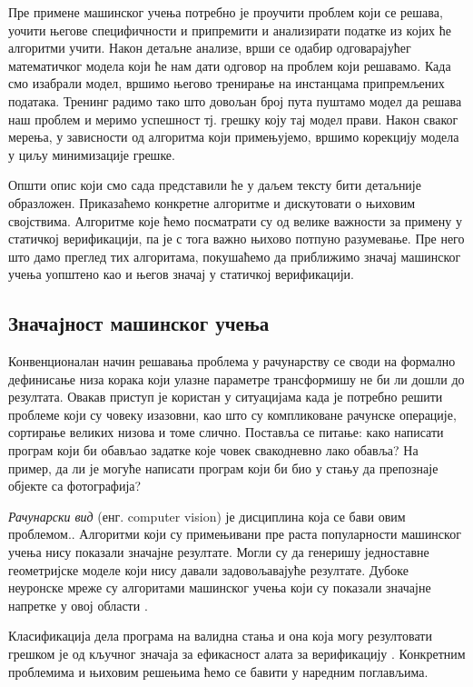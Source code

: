\documentclass[a4paper]{article}
\begin{document}
{Пре примене машинског учења потребно је проучити проблем који се решава, уочити његове специфичности и припремити и анализирати податке из којих ће алгоритми учити. Након детаљне анализе, врши се одабир одговарајућег математичког модела који ће нам дати одговор на проблем који решавамо. Када смо изабрали модел, вршимо његово тренирање на инстанцама припремљених података. Тренинг радимо тако што довољан број пута пуштамо модел да решава наш проблем и меримо успешност тј. грешку коју тај модел прави. Након сваког мерења, у зависности од алгоритма који примењујемо, вршимо корекцију модела у циљу минимизације грешке.


Општи опис који смо сада представили ће у даљем тексту бити детаљније образложен. Приказаћемо конкретне алгоритме и дискутовати о њиховим својствима. Алгоритме које ћемо посматрати су од велике важности за примену у статичкој верификацији, па је с тога важно њихово потпуно разумевање. Пре него што дамо преглед тих алгоритама, покушаћемо да приближимо значај машинског учења уопштено као и његов значај у статичкој верификацији.


\subsection{Значајност машинског учења}
Конвенционалан начин решавања проблема у рачунарству се своди на формално дефинисање низа корака који улазне параметре трансформишу не би ли дошли до резултата. Овакав приступ је користан у ситуацијама када је потребно решити проблеме који су човеку изазовни, као што су компликоване рачунске операције, сортирање великих низова и томе слично. Поставља се питање: како написати програм који би обављао задатке које човек свакодневно лако обавља? На пример, да ли је могуће написати програм који би био у стању да препознаје објекте са фотографија?


\textit{Рачунарски вид} (енг. computer vision) је дисциплина која се бави овим проблемом.\cite{old-cv}. Алгоритми који су примењивани пре раста популарности машинског учења нису показали значајне резултате. Могли су да генеришу једноставне геометријске моделе који нису давали задовољавајуће резултате. Дубоке неуронске мреже су алгоритами машинског учења који су показали значајне напретке у овој области \cite{new-cv}.


Класификација дела програма на валидна стања и она која могу резултовати грешком је од кључног значаја за ефикасност алата за верификацију \cite{Brun04findinglatent} \cite{KrishnaPW15}. Конкретним проблемима и њиховим решењима ћемо се бавити у наредним поглављима.


}
\end{document}
